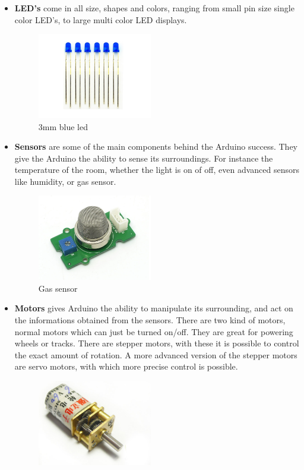 \begin{itemize}
\item[] \textbf{LED's} come in all size, shapes and colors, ranging from small pin size single color LED's, to large multi color LED displays.
\begin{figure}[H]
\centering
\includegraphics[width=5cm]{billeder/led.jpg}
\caption{3mm blue led}
\end{figure}
\item[] \textbf{Sensors} are some of the main components behind the Arduino success. They give the Arduino the ability to sense its surroundings. For instance the temperature of the room, whether the light is on of off, even advanced sensors like humidity, or gas sensor.
\begin{figure}[H]
\centering
\includegraphics[width=5cm]{billeder/Sensor.jpg}
\caption{Gas sensor}
\end{figure}
\item[] \textbf{Motors} gives Arduino the ability to manipulate its surrounding, and act on the informations obtained from the sensors. There are two kind of motors, normal motors which can just be turned on/off. They are great for powering wheels or tracks. There are stepper motors, with these it is possible to control the exact amount of rotation. A more advanced version of the stepper motors are servo motors, with which more precise control is possible.
\begin{figure}[H]
\centering
\includegraphics[width=5cm]{billeder/Motor.jpg}

\end{figure}
\end{itemize}
